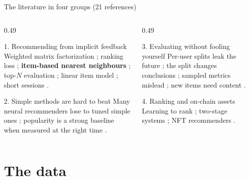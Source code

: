 \documentclass[aspectratio=169,10pt]{beamer}
\begin{document}
\begin{frame}{The literature in four groups (21 references)}
  \small
  \begin{columns}[T]
    \begin{column}{0.49\textwidth}
      \begin{block}{1. Recommending from implicit feedback}
        Weighted matrix factorization \cite{hu2008}; ranking loss \cite{rendle2009};
        \textbf{item-based nearest neighbours} \cite{sarwar2001};
        top-$N$ evaluation \cite{cremonesi2010}; linear item model \cite{steck2019}; short sessions \cite{hidasi2016}.
      \end{block}
      \begin{block}{2. Simple methods are hard to beat}
        Many neural recommenders lose to tuned simple ones \cite{dacrema2019,rendle2020,rendle2021,anelli2022,ludewig2018};
        popularity is a strong baseline when measured at the right time \cite{li2021,ji2020pop}.
      \end{block}
    \end{column}
    \begin{column}{0.49\textwidth}
      \begin{block}{3. Evaluating without fooling yourself}
        Per-user splits leak the future \cite{ji2020leak}; the split changes conclusions \cite{meng2020};
        sampled metrics mislead \cite{krichene2020}; new items need content \cite{schein2002}.
      \end{block}
      \begin{block}{4. Ranking and on-chain assets}
        Learning to rank \cite{burges2010}; two-stage systems \cite{covington2016};
        NFT recommenders \cite{choi2024,nftmine2023}.
      \end{block}
    \end{column}
  \end{columns}
\end{frame}

\section{The data}
\end{document}
